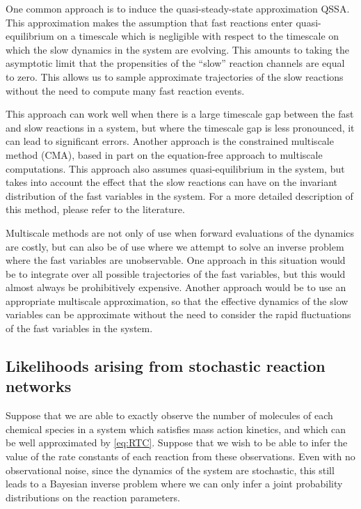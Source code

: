 \documentclass[final]{siamltex}
\begin{document}
One common approach is to induce the quasi-steady-state approximation
QSSA. This approximation makes the assumption that fast reactions
enter quasi-equilibrium on a timescale which is negligible with
respect to the timescale on which the slow dynamics in the system are
evolving. This amounts to taking the asymptotic limit that the
propensities of the ``slow'' reaction channels are equal to zero. This
allows us to sample approximate trajectories of the slow reactions
without the need to compute many fast reaction events.

This approach can work well when there is a large timescale gap
between the fast and slow reactions in a system, but where the
timescale gap is less pronounced, it can lead to significant
errors\cite{cotter2016error}. Another approach is the
constrained multiscale method (CMA)\cite{cotter2011constrained,cotter2016constrained}, based in part on the
equation-free approach to multiscale computations\cite{kevrekidis2003equation,erban2006gene}. This approach also assumes quasi-equilibrium in the
system, but takes into account the effect that the slow reactions can
have on the invariant distribution of the fast variables in the
system. For a more detailed description of this method, please refer
to the literature\cite{cotter2016constrained}.

Multiscale methods are not only of use when forward evaluations of the
dynamics are costly, but can also be of use where we attempt to solve
an inverse problem where the fast variables are unobservable. One
approach in this situation would be to integrate over all possible
trajectories of the fast variables, but this would almost always be
prohibitively expensive. Another approach would be to use an
appropriate multiscale approximation, so that the effective dynamics
of the slow variables can be approximate without the need to consider
the rapid fluctuations of the fast variables in the system.

\subsection{Likelihoods arising from stochastic reaction networks}
Suppose that we are able to exactly observe the number of molecules of
each chemical species in a system which satisfies mass action
kinetics, and which can be well approximated by
\eqref{eq:RTC}. Suppose that we wish to be able to infer the value of
the rate constants of each reaction from these observations. Even with no observational noise, since the dynamics
of the system are stochastic, this still leads to a Bayesian inverse
problem where we can only infer a joint probability distributions on the
reaction parameters.
\end{document}
